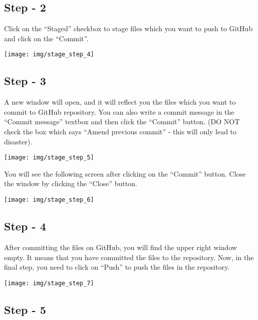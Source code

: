 \documentclass[
]{book}
\begin{document}
\hypertarget{step---2-1}{%
\subsection{Step - 2}\label{step---2-1}}

Click on the ``Staged'' checkbox to stage files which you want to push to GitHub and click on the ``Commit''.

\begin{center}\texttt{[image: img/stage\_step\_4]} \end{center}

\hypertarget{step---3-1}{%
\subsection{Step - 3}\label{step---3-1}}

A new window will open, and it will reflect you the files which you want to commit to GitHub repository. You can also write a commit message in the ``Commit message'' textbox and then click the ``Commit'' button. (DO NOT check the box which says ``Amend previous commit'' - this will only lead to disaster).

\begin{center}\texttt{[image: img/stage\_step\_5]} \end{center}

You will see the following screen after clicking on the ``Commit'' button. Close the window by clicking the ``Close'' button.

\begin{center}\texttt{[image: img/stage\_step\_6]} \end{center}

\hypertarget{step---4-1}{%
\subsection{Step - 4}\label{step---4-1}}

After committing the files on GitHub, you will find the upper right window empty. It means that you have committed the files to the repository. Now, in the final step, you need to click on ``Push'' to push the files in the repository.

\begin{center}\texttt{[image: img/stage\_step\_7]} \end{center}

\hypertarget{step---5-1}{%
\subsection{Step - 5}\label{step---5-1}}
\end{document}
